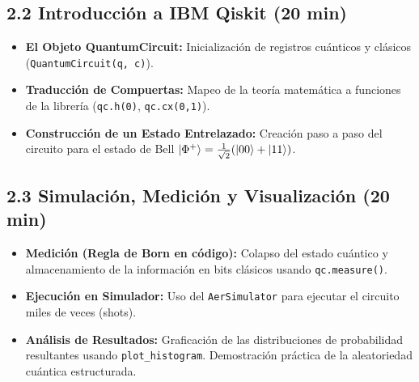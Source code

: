 \documentclass[12pt, a4paper]{article}
\begin{document}
\subsection*{2.2 Introducción a IBM Qiskit (20 min)}
\begin{itemize}
    \item \textbf{El Objeto QuantumCircuit:} Inicialización de registros cuánticos y clásicos (\texttt{QuantumCircuit(q, c)}).
    \item \textbf{Traducción de Compuertas:} Mapeo de la teoría matemática a funciones de la librería (\texttt{qc.h(0)}, \texttt{qc.cx(0,1)}).
    \item \textbf{Construcción de un Estado Entrelazado:} Creación paso a paso del circuito para el estado de Bell $\ket{\Phi^+} = \frac{1}{\sqrt{2}}(\ket{00} + \ket{11})$.
\end{itemize}

\subsection*{2.3 Simulación, Medición y Visualización (20 min)}
\begin{itemize}
    \item \textbf{Medición (Regla de Born en código):} Colapso del estado cuántico y almacenamiento de la información en bits clásicos usando \texttt{qc.measure()}.
    \item \textbf{Ejecución en Simulador:} Uso del \texttt{AerSimulator} para ejecutar el circuito miles de veces (shots).
    \item \textbf{Análisis de Resultados:} Graficación de las distribuciones de probabilidad resultantes usando \texttt{plot\_histogram}. Demostración práctica de la aleatoriedad cuántica estructurada.
\end{itemize}
\end{document}
